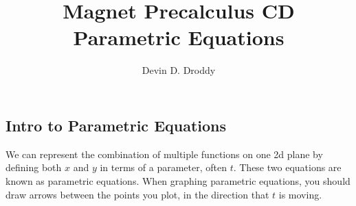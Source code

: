 \documentclass{report}
\title{\Huge{Magnet Precalculus CD}\\Parametric Equations}
\author{\huge{Devin D. Droddy}}
\date{}
\begin{document}
\maketitle
\newpage%
\tableofcontents
\pagebreak

\chapter{}
\section{Intro to Parametric Equations}

We can represent the combination of multiple functions on one 2d plane by defining both $x$ and $y$ in terms of a parameter, often $t$. These two equations are known as parametric equations. When graphing parametric equations, you should draw arrows between the points you plot, in the direction that $t$ is moving.
\end{document}
